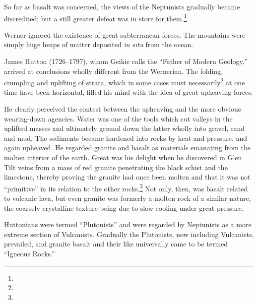 \documentclass[a4paper, 12pt, oneside]{article}
\begin{document}
So far as basalt was concerned, the views of the Neptunists gradually became discredited; but a still greater defeat was in store for them.\footnote{}

Werner ignored the existence of great subterranean forces. The mountains were simply huge heaps of matter deposited \emph{in situ} from the ocean.

James Hutton (1726--1797), whom Geikie calls the ``Father of Modern Geology,'' arrived at conclusions wholly different from the Wernerian. The folding, crumpling and uplifting of strata, which in some cases must necessarily\footnote{} at one time have been horizontal, filled his mind with the idea of great upheaving forces.

He clearly perceived the contest between the upheaving and the more obvious wearing-down agencies. Water was one of the tools which cut valleys in the uplifted masses and ultimately ground down the latter wholly into gravel, sand and mud. The sediments became hardened into rocks by heat and pressure, and again upheaved. He regarded granite and basalt as materials emanating from the molten interior of the earth. Great was his delight when he discovered in Glen Tilt veins from a mass of red granite penetrating the black schist and the limestone, thereby proving the granite had once been molten and that it was not ``primitive'' in its relation to the other rocks.\footnote{} Not only, then, was basalt related to volcanic lava, but even granite was formerly a molten rock of a similar nature, the coarsely crystalline texture being due to slow cooling under great pressure.

Huttonians were termed ``Plutonists'' and were regarded by Neptunists as a more extreme section of Vulcanists. Gradually the Plutonists, now including Vulcanists, prevailed, and granite basalt and their like universally came to be termed ``Igneous Rocks.''
\end{document}
